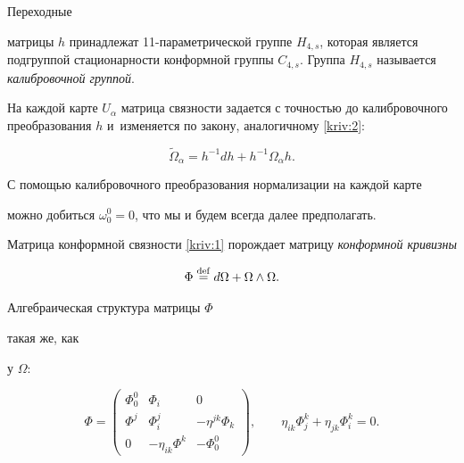 Переходные 

матрицы $h$ принадлежат 11-параметрической группе $H_{4,s}$, которая является подгруппой стационарности конформной группы $C_{4,s}.$ Группа $H_{4,s}$ называется \textit{калибровочной группой}. 

На каждой карте $U_{\alpha }$ матрица связности задается с точностью до калибровочного преобразования $h$ и~изменяется по закону,  аналогичному \eqref{kriv:2}:

\begin{equation}

\widetilde{\Omega }_{\alpha }=h^{-1}dh+h^{-1}\Omega _{\alpha }h.  

\label{kriv:22}

\end{equation}



С помощью калибровочного преобразования нормализации на каждой карте 

можно добиться $\omega _{0}^{0}=0$, что мы и будем всегда далее предполагать. 

Матрица конформной связности \eqref{kriv:1} порождает матрицу \textit{конформной кривизны}

\begin{equation}

\Phi \overset{\rm def}{=}d\Omega +\Omega \wedge \Omega .  

\label{kriv:4}

\end{equation}

Алгебраическая структура матрицы $\Phi $

такая же, как 

у $\Omega $:

\begin{equation}

\Phi =\left( 

\begin{array}{ccc}

\Phi _{0}^{0} & \Phi _{i} & 0 \\ 

\Phi ^{j} & \Phi _{i}^{j} & -\eta ^{jk}\Phi _{k} \\ 

0 & -\eta _{ik}\Phi ^{k} & -\Phi _{0}^{0}\end{array}\right) ,\qquad \eta _{ik}\Phi _{j}^{k}+\eta _{jk}\Phi _{i}^{k}=0.  \label{kriv:5}

\end{equation}

